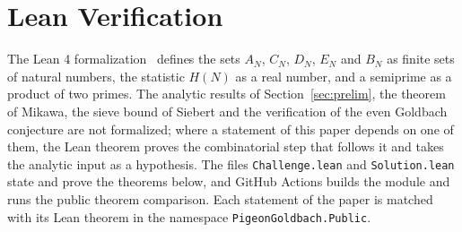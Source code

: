 \documentclass[11pt]{amsart}
\theoremstyle{definition}
\theoremstyle{remark}
\begin{document}

\section{Lean Verification}\label{sec:lean}
The Lean 4 formalization~\cite{vega2026pigeonlean} defines the sets $A_N$, $C_N$, $D_N$, $E_N$ and $B_N$ as finite sets of natural numbers, the statistic $H(N)$ as a real number, and a semiprime as a product of two primes. The analytic results of Section~\ref{sec:prelim}, the theorem of Mikawa, the sieve bound of Siebert and the verification of the even Goldbach conjecture are not formalized; where a statement of this paper depends on one of them, the Lean theorem proves the combinatorial step that follows it and takes the analytic input as a hypothesis. The files \texttt{Challenge.lean} and \texttt{Solution.lean} state and prove the theorems below, and GitHub Actions builds the module and runs the public theorem comparison. Each statement of the paper is matched with its Lean theorem in the namespace \texttt{PigeonGoldbach.Public}.
\end{document}
